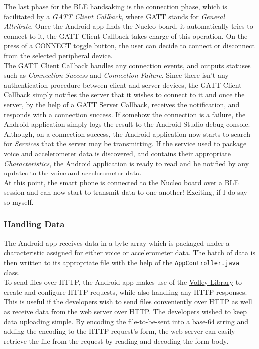 The last phase for the BLE handsaking is the connection phase, which is facilitated by a \textit{GATT Client Callback}, where GATT stands for \textit{General Attribute}. Once the Android app finds the Nucleo board, it automatically tries to connect to it, the GATT Client Callback takes charge of this operation. On the press of a CONNECT toggle button, the user can decide to connect or disconnect from the selected peripheral device.\\

The GATT Client Callback handles any connection events, and outputs statuses such as \textit{Connection Success} and \textit{Connection Failure}. Since there isn't any authentication procedure between client and server devices, the GATT Client Callback simply notifies the server that it wishes to connect to it and once the server, by the help of a GATT Server Callback, receives the notification, and responds with a connection success. If somehow the connection is a failure, the Android application simply logs the result to the Android Studio debug console. Although, on a connection success, the Android application now starts to search for \textit{Services} that the server may be transmitting. If the service used to package voice and accelerometer data is discovered, and contains their appropriate \textit{Characteristics}, the Android application is ready to read and be notified by any updates to the voice and accelerometer data.\\

At this point, the smart phone is connected to the Nucleo board over a BLE session and can now start to transmit data to one another! Exciting, if I do say so myself.

\subsubsection{Handling Data}

The Android app receives data in a byte array which is packaged under a characteristic assigned for either voice or accelerometer data. The batch of data is then written to its appropriate file with the help of the \texttt{AppController.java} class.\\

To send files over HTTP, the Android app makes use of the \href{https://developer.android.com/training/volley/index.html}{Volley Library} to create and configure HTTP requests, while also handling any HTTP responses. This is useful if the developers wish to send files conveniently over HTTP as well as receive data from the web server over HTTP. The developers wished to keep data uploading simple. By encoding the file-to-be-sent into a base-64 string and adding the encoding to the HTTP request's form, the web server can easily retrieve the file from the request by reading and decoding the form body.\\

